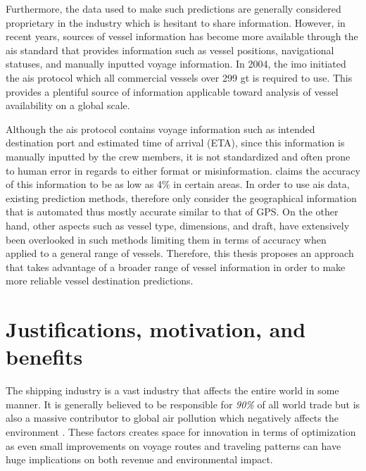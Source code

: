 

Furthermore, the data used to make such predictions are generally considered proprietary in the industry which is hesitant to share information. However, in recent years, sources of vessel information has become more available through the \acrshort{ais} standard that provides information such as vessel positions, navigational statuses, and manually inputted voyage information. In 2004, the \acrfull{imo} initiated the \acrshort{ais} protocol which all commercial vessels over 299 \acrfull{gt} is required to use. This provides a plentiful source of information applicable toward analysis of vessel availability on a global scale.

Although the \acrshort{ais} protocol contains voyage information such as intended destination port and estimated time of arrival (ETA), since this information is manually inputted by the crew members, it is not standardized and often prone to human error in regards to either format or misinformation. \cite{mestl2016} claims the accuracy of this information to be as low as 4\% in certain areas. In order to use \acrshort{ais} data, existing prediction methods, therefore only consider the geographical information that is automated thus mostly accurate similar to that of GPS\@. On the other hand, other aspects such as vessel type, dimensions, and draft, have extensively been overlooked in such methods limiting them in terms of accuracy when applied to a general range of vessels. Therefore, this thesis proposes an approach that takes advantage of a broader range of vessel information in order to make more reliable vessel destination predictions.

\section{Justifications, motivation, and benefits}
\label{section:justifications_motivations_benefits}

The shipping industry is a vast industry that affects the entire world in some manner. It is generally believed to be responsible for \textit{90\%} of all world trade \parencite{grote2016} but is also a massive contributor to global air pollution which negatively affects the environment \parencite{zheng2016:online}. These factors creates space for innovation in terms of optimization as even small improvements on voyage routes and traveling patterns can have huge implications on both revenue and environmental impact.

